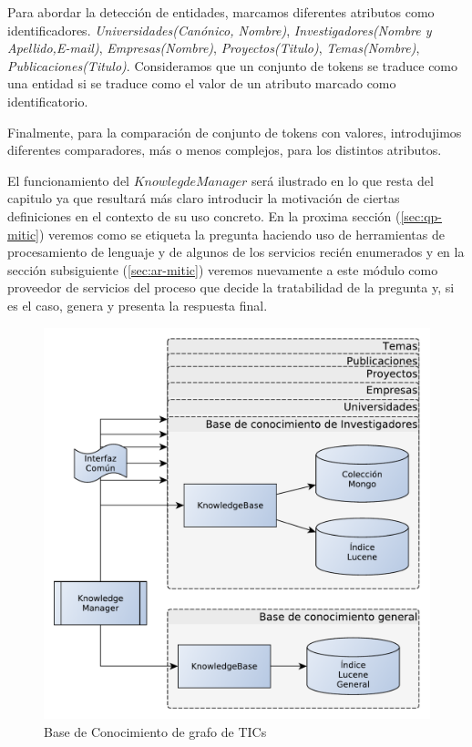 Para abordar la detección de entidades, marcamos diferentes atributos como identificadores. \textit{Universidades(Canónico, Nombre)}, \textit{Investigadores(Nombre y Apellido,E-mail)}, \textit{Empresas(Nombre)}, \textit{Proyectos(Titulo)}, \textit{Temas(Nombre)}, \textit{Publicaciones(Titulo)}. Consideramos que un conjunto de tokens se traduce como una entidad si se traduce como el valor de un atributo marcado como identificatorio. 

Finalmente, para la comparación de conjunto de tokens con valores, introdujimos diferentes comparadores, más o menos complejos, para los distintos atributos. 

El funcionamiento del $KnowlegdeManager$ será ilustrado en lo que resta del capitulo ya que resultará más claro introducir la motivación de ciertas definiciones en el contexto de su uso concreto. En la proxima sección (\ref{sec:qp-mitic}) veremos como se etiqueta la pregunta haciendo uso de herramientas de procesamiento de lenguaje y de algunos de los servicios recién enumerados y en la sección subsiguiente (\ref{sec:ar-mitic}) veremos nuevamente a este módulo como proveedor de servicios del proceso que decide la tratabilidad de la pregunta y, si es el caso, genera y presenta la respuesta final.

\begin{figure}[H]
  \centering
    \includegraphics[scale=0.5]{graficos/KnowledgeManager}
  \caption{Base de Conocimiento de grafo de TICs}
  \label{fig:KnowledgeManager}
\end{figure}


